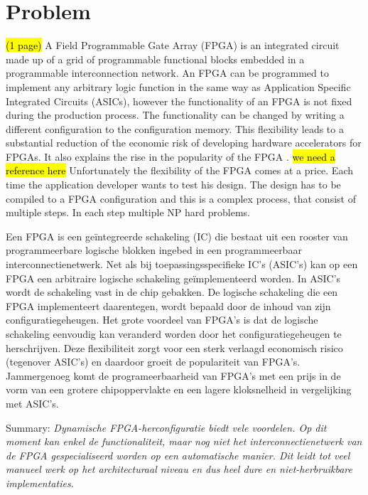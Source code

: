 \documentclass[a4paper,oneside,12pt]{article}
\begin{document}
\newpage

\tableofcontents

\clearpage

\section{Problem}
\hl{(1 page)}
A Field Programmable Gate Array (FPGA) is an integrated circuit made up of a grid of programmable functional blocks embedded in a programmable interconnection network. An FPGA can be programmed to implement any arbitrary logic function in the same way as Application Specific Integrated Circuits (ASICs), however the functionality of an FPGA is not fixed during the production process. The functionality can be changed by writing a different configuration to the configuration memory. This flexibility leads to a substantial reduction of the economic risk of developing hardware accelerators for FPGAs. It also explains the rise in the popularity of the FPGA \cite{}. \hl{we need a reference here} Unfortunately the flexibility of the FPGA comes at a price.  Each time the application developer wants to test his design. The design has to be compiled to a FPGA configuration and this is a complex process, that consist of multiple steps. In each step  multiple NP hard problems. 

Een FPGA is een ge\"integreerde schakeling (IC) die bestaat uit een rooster van programmeerbare logische blokken ingebed in een programmeerbaar interconnectienetwerk. Net als bij toepassingsspecifieke IC's (ASIC's) kan op een FPGA een arbitraire logische schakeling ge\"implementeerd worden. In ASIC's wordt de schakeling vast in de chip gebakken. De logische schakeling die een FPGA implementeert daarentegen, wordt bepaald door de inhoud van zijn configuratiegeheugen. Het grote voordeel van FPGA's is dat de logische schakeling eenvoudig kan veranderd worden door het configuratiegeheugen te herschrijven. Deze flexibiliteit zorgt voor een sterk verlaagd economisch risico (tegenover ASIC's) en daardoor groeit de populariteit van FPGA's. Jammergenoeg komt de programeerbaarheid van FPGA's met een prijs in de vorm van een grotere chipoppervlakte en een lagere kloksnelheid in vergelijking met ASIC's.

Summary: \emph{Dynamische FPGA-herconfiguratie biedt vele voordelen. Op dit moment kan enkel de functionaliteit, maar nog niet het interconnectienetwerk van de FPGA gespecialiseerd worden op een automatische manier. Dit leidt tot veel manueel werk op het architecturaal niveau en dus heel dure en niet-herbruikbare implementaties.} 
\end{document}
